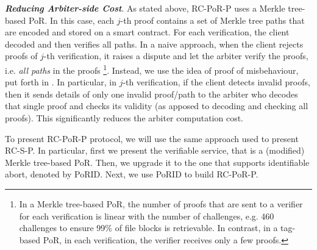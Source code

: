 \noindent\textit{\textbf{Reducing Arbiter-side Cost}}.  As stated above, RC-PoR-P uses a Merkle tree-based PoR. In this case, each $j$-th proof contains a set of Merkle tree paths that are encoded and stored on a smart contract. For each verification, the client decoded and then verifies all paths. In a naive approach, when the client rejects  proofs of $j$-th verification,  it raises a dispute and let the arbiter verify the proofs, i.e. \emph{all paths} in the proofs \footnote{In a Merkle tree-based PoR, the number of proofs that are sent to a verifier for each verification is linear with the number of challenges, e.g. 460 challenges  to ensure 99\% of file blocks is retrievable. In contrast, in a tag-based PoR, in each verification, the verifier receives only a few proofs.}. Instead, we use the idea of proof of misbehaviour, put forth in \cite{}. In particular, in $j$-th verification, if the client detects invalid proofs, then  it  sends  details of only one invalid proof/path to the arbiter  who  decodes that single proof and checks its validity (as apposed to decoding and checking all proofs). This significantly reduces the arbiter computation cost. 


To present RC-PoR-P protocol, we will use the same approach  used to present RC-S-P. In particular, first we present the verifiable service, that is a (modified) Merkle tree-based PoR. Then, we upgrade it to the one that supports  identifiable abort, denoted by PoRID. Next,   we use PoRID to build RC-PoR-P. 






















